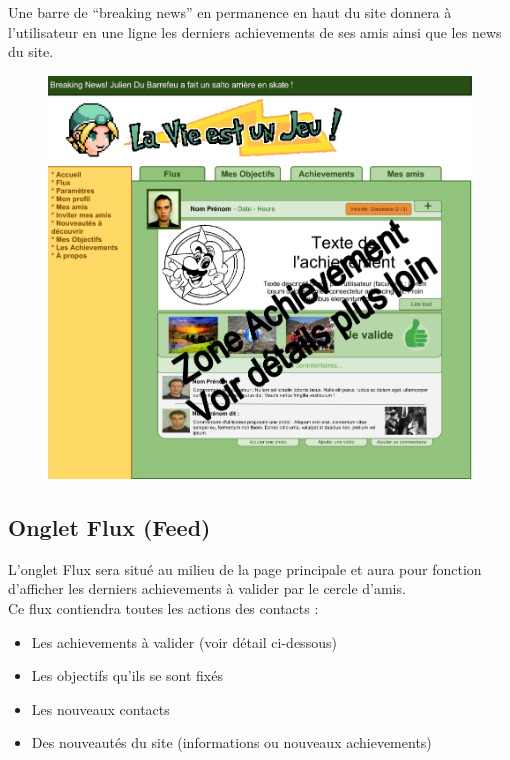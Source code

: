 \documentclass{life-fr}
\begin{document}
Une barre de “breaking news” en permanence en haut du site donnera à l'utilisateur en une ligne les derniers achievements de ses amis ainsi que les news du site.

\begin{figure}[H]
  \begin{center}
    \includegraphics[width=15cm]{img/accueil.png}
  \end{center}
\end{figure}


\subsection{Onglet Flux (Feed)}

L'onglet Flux sera situé au milieu de la page principale et aura pour fonction d'afficher les derniers achievements à valider par le cercle d'amis.\\

Ce flux contiendra toutes les actions des contacts :

\begin{itemize}
  \item Les achievements à valider (voir détail ci-dessous)
  \item Les objectifs qu'ils se sont fixés
  \item Les nouveaux contacts
  \item Des nouveautés du site (informations ou nouveaux achievements)
\end{itemize}
\end{document}
